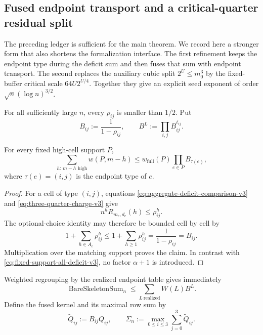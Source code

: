 
\subsection{Fused endpoint transport and a critical-quarter residual split}
\label{subsec:fused-quarter-refinement-v4}

The preceding ledger is sufficient for the main theorem.  We record here a
stronger form that also shortens the formalization interface.  The first
refinement keeps the endpoint type during the deficit sum and then fuses that
sum with endpoint transport.  The second replaces the auxiliary cubic split
$2^U\le m_0^3$ by the fixed-buffer critical scale $64U2^{U/4}$.  Together they give an
explicit seed exponent of order $\sqrt n(\log n)^{3/2}$.

For all sufficiently large $n$, every $\rho_{ij}$ is smaller than $1/2$.
Put
\begin{equation*}
  B_{ij}:=\frac1{1-\rho_{ij}},
  \qquad
  B^L:=\prod_{i,j}B_{ij}^{\ell_{ij}}.
  \tag{9.43}
\end{equation*}

\begin{lemma}
\label{lem:type-preserving-deficit-product-v4}
For every fixed high-cell support $P$,
\begin{equation*}
  \sum_{h:\,m-h\text{ high}} w(P,m-h)
  \le
  w_{\mathrm{full}}(P)
  \prod_{e\in P}B_{\tau(e)},
  \tag{9.44}
\end{equation*}
where $\tau(e)=(i,j)$ is the endpoint type of $e$.
\end{lemma}

\begin{proof}
For a cell of type $(i,j)$, equations
\eqref{eq:aggregate-deficit-comparison-v3} and
\eqref{eq:three-quarter-charge-v3} give
\[
  n^hR_{m_e,d_e}(h)\le \rho_{ij}^h.
\]
The optional-choice identity may therefore be bounded cell by cell by
\[
  1+\sum_{h\in A_e}\rho_{ij}^h
  \le
  1+\sum_{h\ge1}\rho_{ij}^h
  =\frac1{1-\rho_{ij}}
  =B_{ij}.
\]
Multiplication over the matching support proves the claim.  In contrast with
\eqref{eq:fixed-support-all-deficit-v3}, no factor $\alpha+1$ is introduced.
\end{proof}

Weighted regrouping by the realized endpoint table gives immediately
\begin{equation*}
  \operatorname{BareSkeletonSum}_n
  \le
  \sum_{L\ \mathrm{realized}}W(L)B^L.
  \tag{9.45}
\end{equation*}
Define the fused kernel and its maximal row sum by
\begin{equation*}
  \widetilde Q_{ij}:=B_{ij}Q_{ij},
  \qquad
  \Sigma_n:=\max_{0\le i\le3}\sum_{j=0}^{3}\widetilde Q_{ij}.
  \tag{9.46}
\end{equation*}

